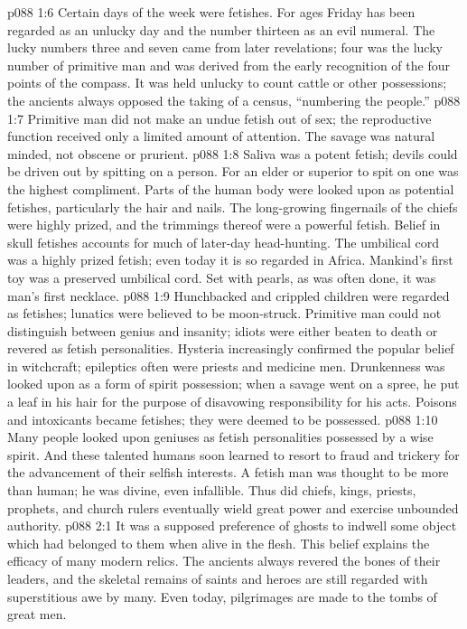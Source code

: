 \vs p088 1:6 Certain days of the week were fetishes. For ages Friday has been regarded as an unlucky day and the number thirteen as an evil numeral. The lucky numbers three and seven came from later revelations; four was the lucky number of primitive man and was derived from the early recognition of the four points of the compass. It was held unlucky to count cattle or other possessions; the ancients always opposed the taking of a census, “numbering the people.”
\vs p088 1:7 Primitive man did not make an undue fetish out of sex; the reproductive function received only a limited amount of attention. The savage was natural minded, not obscene or prurient.
\vs p088 1:8 Saliva was a potent fetish; devils could be driven out by spitting on a person. For an elder or superior to spit on one was the highest compliment. Parts of the human body were looked upon as potential fetishes, particularly the hair and nails. The long\hyp{}growing fingernails of the chiefs were highly prized, and the trimmings thereof were a powerful fetish. Belief in skull fetishes accounts for much of later\hyp{}day head\hyp{}hunting. The umbilical cord was a highly prized fetish; even today it is so regarded in Africa. Mankind’s first toy was a preserved umbilical cord. Set with pearls, as was often done, it was man’s first necklace.
\vs p088 1:9 Hunchbacked and crippled children were regarded as fetishes; lunatics were believed to be moon\hyp{}struck. Primitive man could not distinguish between genius and insanity; idiots were either beaten to death or revered as fetish personalities. Hysteria increasingly confirmed the popular belief in witchcraft; epileptics often were priests and medicine men. Drunkenness was looked upon as a form of spirit possession; when a savage went on a spree, he put a leaf in his hair for the purpose of disavowing responsibility for his acts. Poisons and intoxicants became fetishes; they were deemed to be possessed.
\vs p088 1:10 Many people looked upon geniuses as fetish personalities possessed by a wise spirit. And these talented humans soon learned to resort to fraud and trickery for the advancement of their selfish interests. A fetish man was thought to be more than human; he was divine, even infallible. Thus did chiefs, kings, priests, prophets, and church rulers eventually wield great power and exercise unbounded authority.
\vs p088 2:1 It was a supposed preference of ghosts to indwell some object which had belonged to them when alive in the flesh. This belief explains the efficacy of many modern relics. The ancients always revered the bones of their leaders, and the skeletal remains of saints and heroes are still regarded with superstitious awe by many. Even today, pilgrimages are made to the tombs of great men.
